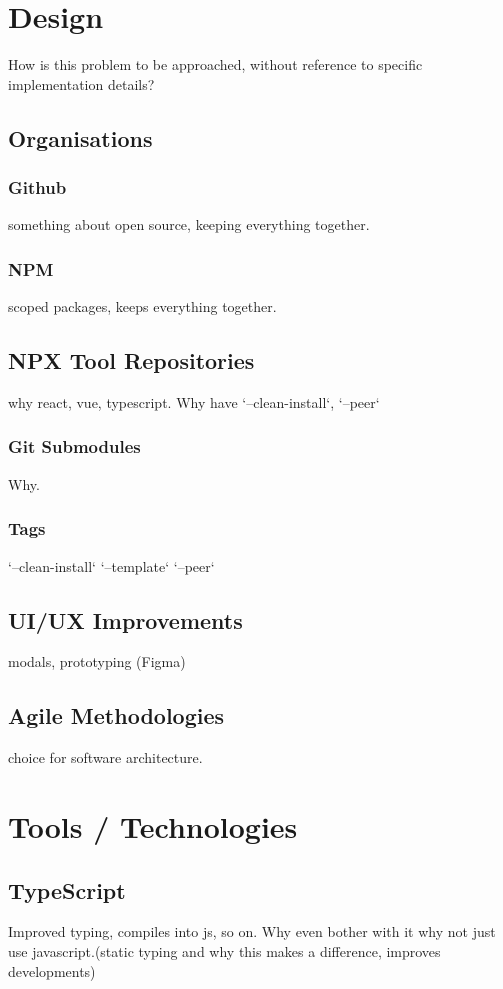 \documentclass{l4proj}
\begin{document}
\chapter{Design}
How is this problem to be approached, without reference to specific implementation details? 
\section{Organisations}
\subsection{Github}
\text something about open source, keeping everything together.
\subsection{NPM}
\text scoped packages, keeps everything together.
\section{NPX Tool Repositories}
\text why react, vue, typescript. Why have `--clean-install`, `--peer`
\subsection{Git Submodules}
\text Why.
\subsection{Tags}
\text `--clean-install` `--template` `--peer`
\section{UI/UX Improvements}
\text modals, prototyping (Figma)
\section{Agile Methodologies}
\text choice for software architecture.
\chapter{Tools / Technologies}

\section{TypeScript}
\text Improved typing, compiles into js, so on. Why even bother with it why not just use javascript.(static typing and why this makes a difference, improves developments)
\end{document}
